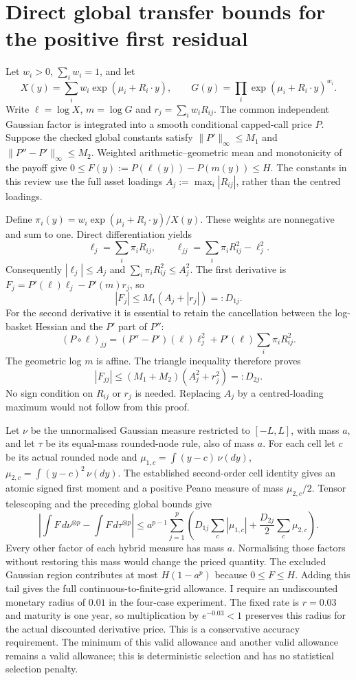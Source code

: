 \section{Direct global transfer bounds for the positive first residual}
Let $w_i>0$, $\sum_iw_i=1$, and let
\[
 X(y)=\sum_iw_i\exp(\mu_i+R_i\cdot y),\qquad
 G(y)=\prod_i\exp(\mu_i+R_i\cdot y)^{w_i}.
\]
Write $\ell=\log X$, $m=\log G$ and $r_j=\sum_iw_iR_{ij}$.
The common independent Gaussian factor is integrated into a smooth
conditional capped-call price $P$. Suppose the checked global constants
satisfy $\|P'\|_\infty\leq M_1$ and
$\|P''-P'\|_\infty\leq M_2$.
Weighted arithmetic--geometric mean and monotonicity of the payoff give
$0\leq F(y):=P(\ell(y))-P(m(y))\leq H$.
The constants in this review use the full asset loadings
$A_j:=\max_i|R_{ij}|$, rather than the centred loadings.

Define $\pi_i(y)=w_i\exp(\mu_i+R_i\cdot y)/X(y)$.
These weights are nonnegative and sum to one. Direct differentiation yields
\[
 \ell_j=\sum_i\pi_iR_{ij},\qquad
 \ell_{jj}=\sum_i\pi_iR_{ij}^{2}-\ell_j^2.
\]
Consequently $|\ell_j|\leq A_j$ and
$\sum_i\pi_iR_{ij}^{2}\leq A_j^2$. The first derivative is
$F_j=P'(\ell)\ell_j-P'(m)r_j$, so
\[
 |F_j|\leq M_1(A_j+|r_j|)=:D_{1j}.
\]
For the second derivative it is essential to retain the cancellation
between the log-basket Hessian and the $P'$ part of $P''$:
\[
 (P\circ\ell)_{jj}
  =(P''-P')(\ell)\ell_j^2
   +P'(\ell)\sum_i\pi_iR_{ij}^{2}.
\]
The geometric log $m$ is affine. The triangle inequality therefore proves
\[
 |F_{jj}|\leq(M_1+M_2)(A_j^2+r_j^2)=:D_{2j}.
\]
No sign condition on $R_{ij}$ or $r_j$ is needed. Replacing $A_j$ by a
centred-loading maximum would not follow from this proof.

Let $\nu$ be the unnormalised Gaussian measure restricted to $[-L,L]$,
with mass $a$, and let $\tau$ be its equal-mass rounded-node rule,
also of mass $a$. For each cell let $c$ be its actual rounded node and
$\mu_{1,c}=\int(y-c)\,\nu(dy)$,
$\mu_{2,c}=\int(y-c)^2\,\nu(dy)$.
The established second-order cell identity gives an atomic signed first
moment and a positive Peano measure of mass
$\mu_{2,c}/2$. Tensor telescoping and the preceding global bounds give
\[
 \left|\int F\,d\nu^{\otimes p}-\int F\,d\tau^{\otimes p}\right|
 \leq a^{p-1}\sum_{j=1}^p
 \left(D_{1j}\sum_c|\mu_{1,c}|
       +\frac{D_{2j}}{2}\sum_c\mu_{2,c}\right).
\]
Every other factor of each hybrid measure has mass $a$. Normalising those
factors without restoring this mass would change the priced quantity.
The excluded Gaussian region contributes at most $H(1-a^p)$ because
$0\leq F\leq H$. Adding this tail gives the full continuous-to-finite-grid
allowance. I require an undiscounted monetary radius of $0.01$ in the
four-case experiment. The fixed rate is $r=0.03$ and maturity is one year,
so multiplication by $e^{-0.03}<1$ preserves this radius for the actual
discounted derivative price. This is a conservative accuracy requirement.
The minimum of this valid allowance and another valid allowance remains
a valid allowance; this is deterministic selection and has no statistical
selection penalty.

